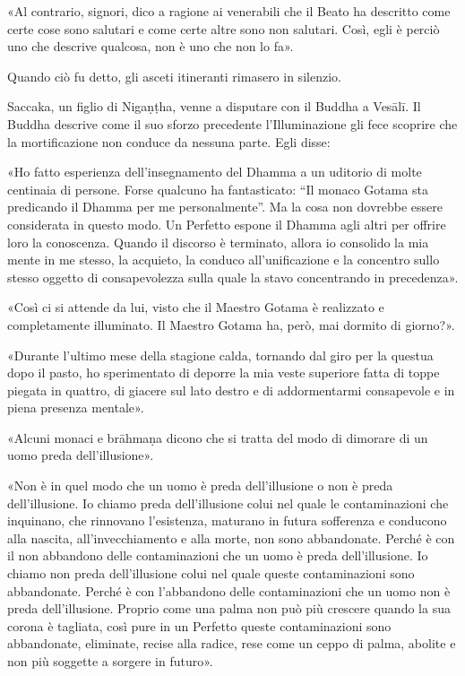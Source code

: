 «Al contrario, signori, dico a ragione ai venerabili che il Beato ha
descritto come certe cose sono salutari e come certe altre sono non
salutari. Così, egli è perciò uno che descrive qualcosa, non è uno che
non lo fa».


Quando ciò fu detto, gli asceti itineranti rimasero in silenzio.




 Saccaka, un figlio di Nigaṇṭha, venne a disputare con
il Buddha a Vesālī. Il Buddha descrive come il suo sforzo precedente
l’Illuminazione gli fece scoprire che la mortificazione non conduce da
nessuna parte. Egli disse:


 «Ho fatto esperienza dell’insegnamento del Dhamma a
un uditorio di molte centinaia di persone. Forse qualcuno ha
fantasticato: “Il monaco Gotama sta predicando il Dhamma per me
personalmente”. Ma la cosa non dovrebbe essere considerata in questo
modo. Un Perfetto espone il Dhamma agli altri per offrire loro la
conoscenza. Quando il discorso è terminato, allora io consolido la mia
mente in me stesso, la acquieto, la conduco all’unificazione e la
concentro sullo stesso oggetto di consapevolezza sulla quale la stavo
concentrando in precedenza».


«Così ci si attende da lui, visto che il Maestro Gotama è realizzato e
completamente illuminato. Il Maestro Gotama ha, però, mai dormito di
giorno?».


«Durante l’ultimo mese della stagione calda, tornando dal giro per la
questua dopo il pasto, ho sperimentato di deporre la mia veste superiore
fatta di toppe piegata in quattro, di giacere sul lato destro e di
addormentarmi consapevole e in piena presenza mentale».


«Alcuni monaci e brāhmaṇa dicono che si tratta del modo di dimorare di
un uomo preda dell’illusione».


«Non è in quel modo che un uomo è preda dell’illusione o non è preda
dell’illusione. Io chiamo preda dell’illusione colui nel quale le
contaminazioni che inquinano, che rinnovano l’esistenza, maturano in
futura sofferenza e conducono alla nascita, all’invecchiamento e alla
morte, non sono abbandonate. Perché è con il non abbandono delle
contaminazioni che un uomo è preda dell’illusione. Io chiamo non preda
dell’illusione colui nel quale queste contaminazioni sono abbandonate.
Perché è con l’abbandono delle contaminazioni che un uomo non è preda
dell’illusione. Proprio come una palma non può più crescere quando la
sua corona è tagliata, così pure in un Perfetto queste contaminazioni
sono abbandonate, eliminate, recise alla radice, rese come un ceppo di
palma, abolite e non più soggette a sorgere in futuro».


